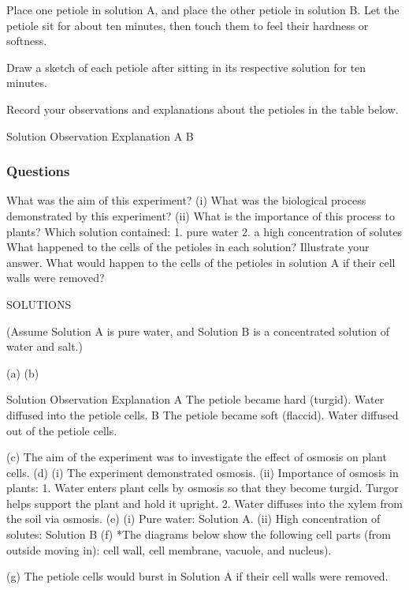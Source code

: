 \begin{enumerate}
Place one petiole in solution A, and place the other petiole in solution B. Let the petiole  sit for about ten minutes, then touch them to feel their hardness or softness.

Draw a sketch of each petiole after sitting in its respective solution for ten minutes.

Record your observations and explanations about the petioles in the table below.

Solution
Observation
Explanation
A
B

\subsubsection{Questions}

What was the aim of this experiment?
    (i) What was the biological process demonstrated by this experiment?
              (ii) What is the importance of this process to plants?
Which solution contained:
1. pure water 
2. a high concentration of solutes
What happened to the cells of the petioles in each solution? Illustrate your answer.
What would happen to the cells of the petioles in solution A if their cell walls were removed?

SOLUTIONS

(Assume Solution A is pure water, and Solution B is a concentrated solution of water and salt.)

(a) 
(b)

Solution
Observation
Explanation
A
The petiole became hard (turgid).
Water diffused into the petiole cells.
B
The petiole became soft (flaccid).
Water diffused out of the petiole cells.

(c) The aim of the experiment was to investigate the effect of osmosis on plant cells.
(d)       (i) The experiment demonstrated osmosis.
(ii) Importance of osmosis in plants: 
1. Water enters plant cells by osmosis so that they become turgid. Turgor helps support the plant and hold it upright.
2. Water diffuses into the xylem from the soil via osmosis.
(e)      (i) Pure water: Solution A. 
      (ii) High concentration of solutes: Solution B
(f)  *The diagrams below show the following cell parts (from outside moving in): cell wall, cell membrane, vacuole, and nucleus).

(g) The petiole cells would burst in Solution A if their cell walls were removed.


\end{enumerate}
